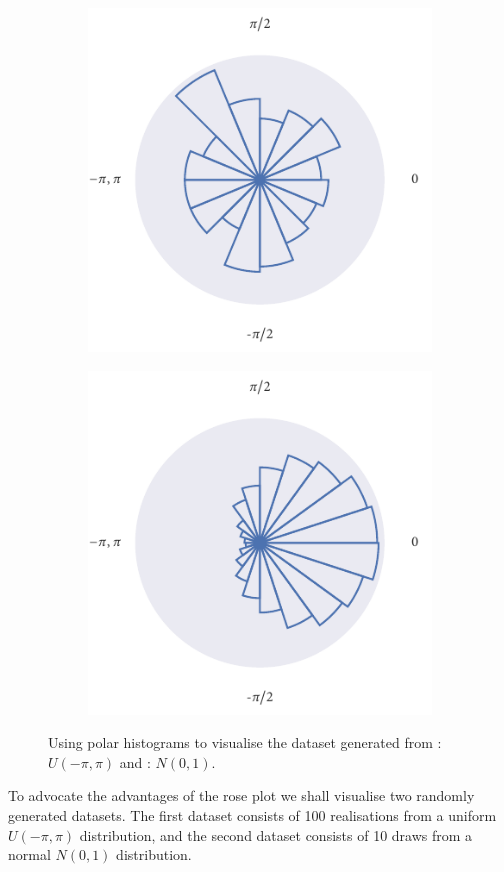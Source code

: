 \begin{figure}
	\begin{subfigure}[b]{0.45\textwidth}
		\includegraphics{unif_angle_rose.pdf}
		\caption{}
		\label{subfig:unif_angle_rose}
	\end{subfigure}%
	\hspace{0.05\textwidth}%
	\begin{subfigure}[b]{0.45\textwidth}
		\includegraphics{norm_angle_rose.pdf}
		\caption{}
		\label{subfig:norm_angle_rose}
	\end{subfigure}
	\caption{Using polar histograms to visualise the dataset generated from : $U(-\pi,\pi)$ and : $N(0, 1)$.}
	\label{fig:angle_rose}
\end{figure}
To advocate the advantages of the rose plot we shall visualise two randomly generated datasets. The first dataset consists of 100 realisations from a uniform $U(-\pi,\pi)$ distribution, and the second dataset consists of 10 draws from a normal $N(0, 1)$ distribution.

